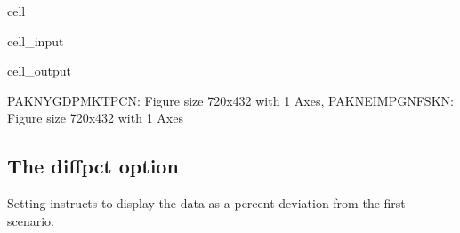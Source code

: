 \documentclass[letterpaper,10pt,english]{jupyterBook}
\begin{document}
\begin{sphinxuseclass}{cell}\begin{sphinxVerbatimInput}

\begin{sphinxuseclass}{cell_input}
\begin{sphinxVerbatim}[commandchars=\\\{\}]
  
\end{sphinxVerbatim}

\end{sphinxuseclass}\end{sphinxVerbatimInput}
\begin{sphinxVerbatimOutput}

\begin{sphinxuseclass}{cell_output}
\begin{sphinxVerbatim}[commandchars=\\\{\}]
\PYGZob{}\PYGZsq{}PAKNYGDPMKTPCN\PYGZsq{}: \PYGZlt{}Figure size 720x432 with 1 Axes\PYGZgt{},
 \PYGZsq{}PAKNEIMPGNFSKN\PYGZsq{}: \PYGZlt{}Figure size 720x432 with 1 Axes\PYGZgt{}\PYGZcb{}
\end{sphinxVerbatim}

\end{sphinxuseclass}\end{sphinxVerbatimOutput}

\end{sphinxuseclass}

\subsection{The diffpct option}
\label{\detokenize{content/05_WBModels/ScenarioAnalysis:the-diffpct-option}}
\sphinxAtStartPar
Setting  instructs  to display the data as a percent deviation from the first  scenario.
\end{document}
